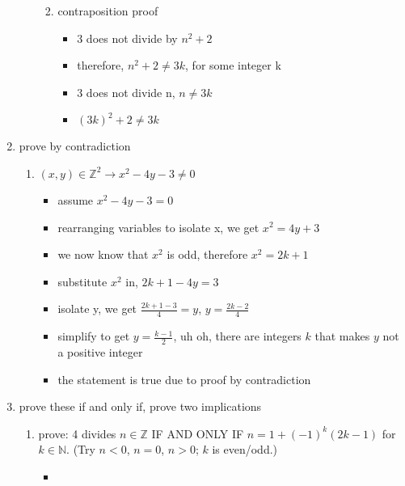 \documentclass[12pt]{article}
\begin{document}
\begin{enumerate}
\begin{enumerate}
\begin{enumerate}
\begin{itemize}
                \end{itemize}
                \item contraposition proof
                \begin{itemize}
                    \item 3 does not divide by $n^2 + 2$
                    \item therefore, $n^2 + 2 \neq 3k$, for some integer k
                    \item 3 does not divide n, $n \neq 3k$
                    \item $(3k)^2 + 2 \neq 3k$
                \end{itemize}
            \end{enumerate}
        \end{enumerate}
        \item prove by contradiction
        \begin{enumerate}
            \item $(x, y) \in \mathbb{Z}^2 \rightarrow x^2 - 4y -3 \neq 0$
            \begin{itemize}
                \item assume $x^2 - 4y - 3 = 0$
                \item rearranging variables to isolate x, we get $x^2 = 4y + 3$
                \item we now know that $x^2$ is odd, therefore $x^2 = 2k+1$
                \item substitute $x^2$ in, $2k + 1 - 4y = 3$
                \item isolate y, we get $\frac{2k + 1 - 3}{4} = y$, $y = \frac{2k-2}{4}$
                \item simplify to get $y = \frac{k - 1}{2}$, uh oh, there are integers $k$ that makes $y$ not a positive integer
                \item the statement is true due to proof by contradiction
            \end{itemize}
        \end{enumerate}
        \item prove these if and only if, prove two implications
        \begin{enumerate}
            \item prove: 4 divides $n \in \mathbb{Z}$ IF AND ONLY IF $n = 1 + (-1)^k(2k-1)$ for $k \in \mathbb{N}$. (Try $n < 0$, $n = 0$, $n > 0$; $k$ is even/odd.)
            \begin{itemize}
                \item 

\end{itemize}
\end{enumerate}
\end{enumerate}
\end{document}
